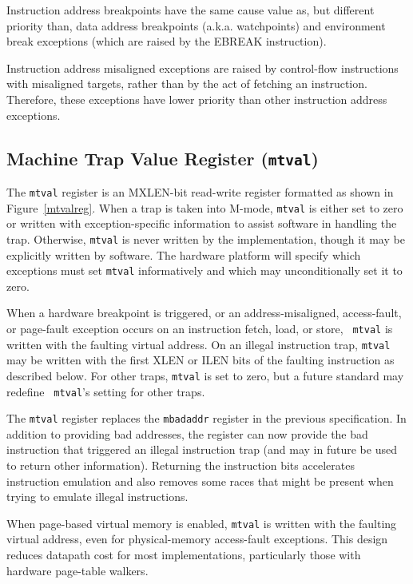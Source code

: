 \begin{commentary}
Instruction address breakpoints have the same cause value as, but
different priority than, data address breakpoints (a.k.a. watchpoints)
and environment break exceptions (which are raised by the EBREAK instruction).
\end{commentary}

\begin{commentary}
Instruction address misaligned exceptions are raised by control-flow
instructions with misaligned targets, rather than by the act of fetching an
instruction.  Therefore, these exceptions have lower priority than other
instruction address exceptions.
\end{commentary}

\FloatBarrier
\subsection{Machine Trap Value Register ({\tt mtval})}

The {\tt mtval} register is an MXLEN-bit read-write register formatted as shown
in Figure~\ref{mtvalreg}.  When a trap is taken into M-mode, {\tt mtval} is
either set to zero or written with exception-specific information to assist
software in handling the trap.  Otherwise, {\tt mtval} is never written by the
implementation, though it may be explicitly written by software.  The hardware
platform will specify which exceptions must set {\tt mtval} informatively and
which may unconditionally set it to zero.

When a hardware breakpoint is triggered, or an
address-misaligned, access-fault, or page-fault exception occurs
on an instruction fetch, load, or store, {\tt
  mtval} is written with the faulting virtual address.  On an illegal
instruction trap, {\tt mtval} may be written with the first XLEN or ILEN
bits of the faulting instruction as described below.  For other traps,
{\tt mtval} is set to zero, but a future standard may redefine {\tt
  mtval}'s setting for other traps.

\begin{commentary}
  The {\tt mtval} register replaces the {\tt mbadaddr} register in
  the previous specification.  In addition to providing bad addresses,
  the register can now provide the bad instruction that triggered an
  illegal instruction trap (and may in future be used to return other
  information).  Returning the instruction bits accelerates instruction emulation and also
  removes some races that might be present when trying to emulate
  illegal instructions.
\end{commentary}
\begin{commentary}
  When page-based virtual memory is enabled, {\tt mtval} is written with
  the faulting virtual address, even for physical-memory access-fault exceptions.
  This design reduces datapath cost for most implementations, particularly
  those with hardware page-table walkers.
\end{commentary}


